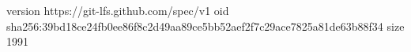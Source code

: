 version https://git-lfs.github.com/spec/v1
oid sha256:39bd18ce24fb0ee86f8c2d49aa89ce5bb52aef2f7c29ace7825a81de63b88f34
size 1991
